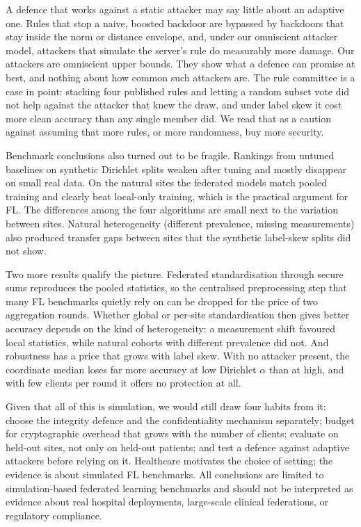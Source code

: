 \documentclass[conference]{IEEEtran}
\begin{document}
A defence that works against a static attacker may say little about an adaptive one. Rules that stop a naive, boosted backdoor are bypassed by backdoors that stay inside the norm or distance envelope, and, under our omniscient attacker model, attackers that simulate the server's rule do measurably more damage. Our attackers are omniscient upper bounds. They show what a defence can promise at best, and nothing about how common such attackers are. The rule committee is a case in point: stacking four published rules and letting a random subset vote did not help against the attacker that knew the draw, and under label skew it cost more clean accuracy than any single member did. We read that as a caution against assuming that more rules, or more randomness, buy more security.

Benchmark conclusions also turned out to be fragile. Rankings from untuned baselines on synthetic Dirichlet splits weaken after tuning and mostly disappear on small real data. On the natural sites the federated models match pooled training and clearly beat local-only training, which is the practical argument for FL. The differences among the four algorithms are small next to the variation between sites. Natural heterogeneity (different prevalence, missing measurements) also produced transfer gaps between sites that the synthetic label-skew splits did not show.

Two more results qualify the picture. Federated standardisation through secure sums reproduces the pooled statistics, so the centralised preprocessing step that many FL benchmarks quietly rely on can be dropped for the price of two aggregation rounds. Whether global or per-site standardisation then gives better accuracy depends on the kind of heterogeneity: a measurement shift favoured local statistics, while natural cohorts with different prevalence did not. And robustness has a price that grows with label skew. With no attacker present, the coordinate median loses far more accuracy at low Dirichlet $\alpha$ than at high, and with few clients per round it offers no protection at all.

Given that all of this is simulation, we would still draw four habits from it: choose the integrity defence and the confidentiality mechanism separately; budget for cryptographic overhead that grows with the number of clients; evaluate on held-out sites, not only on held-out patients; and test a defence against adaptive attackers before relying on it. Healthcare motivates the choice of setting; the evidence is about simulated FL benchmarks. All conclusions are limited to simulation-based federated learning benchmarks and should not be interpreted as evidence about real hospital deployments, large-scale clinical federations, or regulatory compliance.
\end{document}
